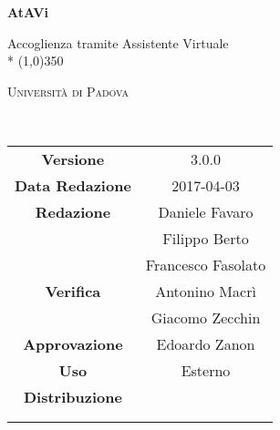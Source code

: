 \documentclass[a4paper,12pt]{article}
\date{2017-04-03}
\begin{document}
	\begin{titlepage}
		\centering
		{\huge\bfseries AtAVi\par}
		Accoglienza tramite Assistente Virtuale \\*
		\line(1,0){350} \\
		{\scshape\LARGE Università di Padova \par}
		\vspace{1cm}
		{\scshape\Large \analisideirequisitiRQ\ \par}
		\logo
		\newpage
		\begin{tabular}{c|c}
			{\hfill \textbf{Versione}} 			& 3.0.0						\\ 
			{\hfill\textbf{Data Redazione}} 	& 2017-04-03 		\\ 
			{\hfill\textbf{Redazione}} 			& Daniele Favaro \\ & Filippo Berto \\ & Francesco Fasolato \\ 
			{\hfill\textbf{Verifica}} 			& Antonino Macrì \\  & Giacomo Zecchin \\ 
			{\hfill\textbf{Approvazione}} 		& Edoardo Zanon		\\
			{\hfill\textbf{Uso}} 				& Esterno 				\\
			{\hfill\textbf{Distribuzione}} 		& \vardanega \\ & \cardin \\ & \prop \\
		\end{tabular}
	\end{titlepage}
	
	\pagestyle{myfront}
	\newpage
	
	\newpage
	\tableofcontents
	\newpage
	\listoftables
	\newpage
	\listoffigures
	
	\label{LastFrontPage}	
	\newpage	
	\pagestyle{mymain}
				
	\newpage	
		
	\newpage	
			
	\newpage	
		
		
	\label{LastPage}
\end{document}
